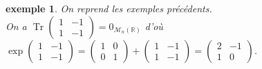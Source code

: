 \documentclass[a4paper]{article}
\newtheorem*{example}{exemple}
\begin{document}
\begin{example}
    On reprend les exemples précédents.\\
    On a $\operatorname{Tr}\begin{pmatrix}1 & -1 \\ 1 & -1\end{pmatrix} = 0_{\mathcal{M}_{n}(\mathbb{R})}$ d'où $\exp \begin{pmatrix}1 & -1 \\ 1 & -1\end{pmatrix} = \begin{pmatrix}1 & 0 \\ 0 & 1\end{pmatrix} + \begin{pmatrix}1 & -1 \\ 1 & -1\end{pmatrix} = \begin{pmatrix}2 & -1 \\ 1 & 0\end{pmatrix}$.\\

\end{example}
\end{document}
